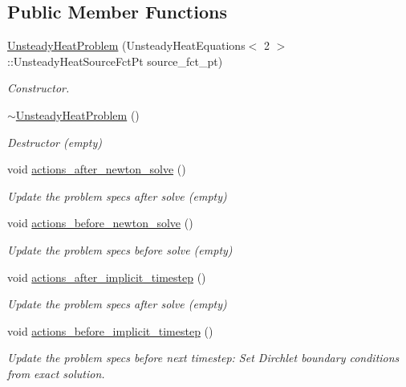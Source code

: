 \subsection*{Public Member Functions}
\begin{DoxyCompactItemize}
\item 
\hyperlink{classUnsteadyHeatProblem_abd3a46eea132b1e5872be6a6309a51b2}{Unsteady\+Heat\+Problem} (Unsteady\+Heat\+Equations$<$ 2 $>$\+::Unsteady\+Heat\+Source\+Fct\+Pt source\+\_\+fct\+\_\+pt)
\begin{DoxyCompactList}\small\item\em Constructor. \end{DoxyCompactList}\item 
\hyperlink{classUnsteadyHeatProblem_acd342b40828d9e18b3571e00b3d34add}{$\sim$\+Unsteady\+Heat\+Problem} ()
\begin{DoxyCompactList}\small\item\em Destructor (empty) \end{DoxyCompactList}\item 
void \hyperlink{classUnsteadyHeatProblem_a88e3d534b5904f7c10ce6a8fbd6df0ea}{actions\+\_\+after\+\_\+newton\+\_\+solve} ()
\begin{DoxyCompactList}\small\item\em Update the problem specs after solve (empty) \end{DoxyCompactList}\item 
void \hyperlink{classUnsteadyHeatProblem_aa1ee8fbe2a5439d1cacb37131e0f81c6}{actions\+\_\+before\+\_\+newton\+\_\+solve} ()
\begin{DoxyCompactList}\small\item\em Update the problem specs before solve (empty) \end{DoxyCompactList}\item 
void \hyperlink{classUnsteadyHeatProblem_afd14cbe343adfa39e3b8b2ca681c5020}{actions\+\_\+after\+\_\+implicit\+\_\+timestep} ()
\begin{DoxyCompactList}\small\item\em Update the problem specs after solve (empty) \end{DoxyCompactList}\item 
void \hyperlink{classUnsteadyHeatProblem_a7074e52f6a3a791549687e1b4ddd059a}{actions\+\_\+before\+\_\+implicit\+\_\+timestep} ()
\begin{DoxyCompactList}\small\item\em Update the problem specs before next timestep\+: Set Dirchlet boundary conditions from exact solution. \end{DoxyCompactList}\item 

\end{DoxyCompactItemize}

